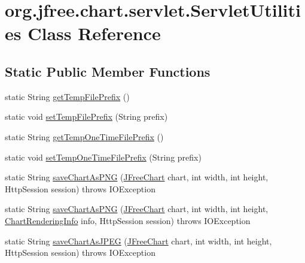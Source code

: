 \hypertarget{classorg_1_1jfree_1_1chart_1_1servlet_1_1_servlet_utilities}{}\section{org.\+jfree.\+chart.\+servlet.\+Servlet\+Utilities Class Reference}
\label{classorg_1_1jfree_1_1chart_1_1servlet_1_1_servlet_utilities}
\subsection*{Static Public Member Functions}
\begin{DoxyCompactItemize}
\item 
static String \mbox{\hyperlink{classorg_1_1jfree_1_1chart_1_1servlet_1_1_servlet_utilities_afa4bff11c42f4afca7ebbfa5238cbdbb}{get\+Temp\+File\+Prefix}} ()
\item 
static void \mbox{\hyperlink{classorg_1_1jfree_1_1chart_1_1servlet_1_1_servlet_utilities_aa04ae76d0a148df4758391054142fabf}{set\+Temp\+File\+Prefix}} (String prefix)
\item 
static String \mbox{\hyperlink{classorg_1_1jfree_1_1chart_1_1servlet_1_1_servlet_utilities_a30db9cc27057e0b1118f9c22a61cb290}{get\+Temp\+One\+Time\+File\+Prefix}} ()
\item 
static void \mbox{\hyperlink{classorg_1_1jfree_1_1chart_1_1servlet_1_1_servlet_utilities_a87f9344da6588038a44afac01d588aa8}{set\+Temp\+One\+Time\+File\+Prefix}} (String prefix)
\item 
static String \mbox{\hyperlink{classorg_1_1jfree_1_1chart_1_1servlet_1_1_servlet_utilities_a8df3dbbed1ab2d1c130c23dcfdf5d3cc}{save\+Chart\+As\+P\+NG}} (\mbox{\hyperlink{classorg_1_1jfree_1_1chart_1_1_j_free_chart}{J\+Free\+Chart}} chart, int width, int height, Http\+Session session)  throws I\+O\+Exception 
\item 
static String \mbox{\hyperlink{classorg_1_1jfree_1_1chart_1_1servlet_1_1_servlet_utilities_ade3bfa33a63f5b4564a0c21dced5eabb}{save\+Chart\+As\+P\+NG}} (\mbox{\hyperlink{classorg_1_1jfree_1_1chart_1_1_j_free_chart}{J\+Free\+Chart}} chart, int width, int height, \mbox{\hyperlink{classorg_1_1jfree_1_1chart_1_1_chart_rendering_info}{Chart\+Rendering\+Info}} info, Http\+Session session)  throws I\+O\+Exception 
\item 
static String \mbox{\hyperlink{classorg_1_1jfree_1_1chart_1_1servlet_1_1_servlet_utilities_a57e551f538c4e9227cba5c7e487a8e58}{save\+Chart\+As\+J\+P\+EG}} (\mbox{\hyperlink{classorg_1_1jfree_1_1chart_1_1_j_free_chart}{J\+Free\+Chart}} chart, int width, int height, Http\+Session session)  throws I\+O\+Exception 

\end{DoxyCompactItemize}
